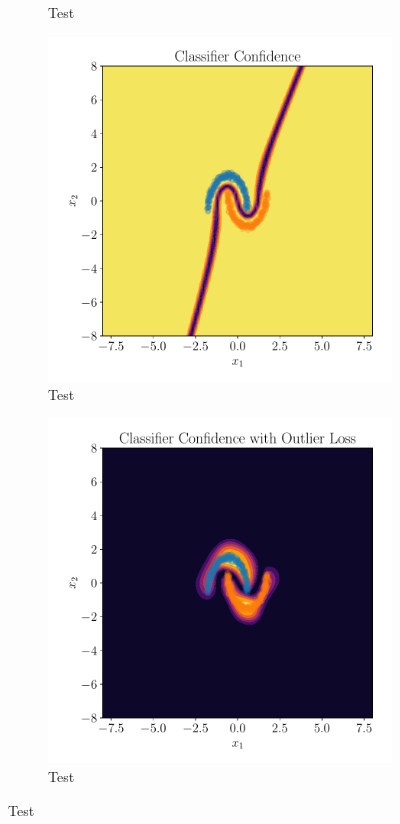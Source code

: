 \begin{figure}[htpb]
\begin{subfigure}[]{0.4\textwidth}
        \caption{Test}
        \label{fig:moons_class_kl}
    \end{subfigure}
    \begin{subfigure}[]{0.4\textwidth}
        \centering
    \includegraphics[width=\linewidth]{figures/toy_example/moons/classifier_confidence.pdf}
        \caption{Test}
        \label{fig:moons_confidence}
    \end{subfigure}
    \begin{subfigure}[]{0.4\textwidth}
        \centering
    \includegraphics[width=\linewidth]{figures/toy_example/moons/classifier_kl_confidence.pdf}
        \caption{Test}
        \label{fig:moons_confidence_kl}
    \end{subfigure}
    

\end{figure}
